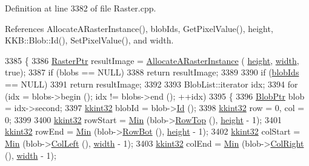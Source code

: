Definition at line 3382 of file Raster.\+cpp.



References Allocate\+A\+Raster\+Instance(), blob\+Ids, Get\+Pixel\+Value(), height, K\+K\+B\+::\+Blob\+::\+Id(), Set\+Pixel\+Value(), and width.


\begin{DoxyCode}
3385 \{
3386   \hyperlink{class_k_k_b_1_1_raster}{RasterPtr}  resultImage = \hyperlink{class_k_k_b_1_1_raster_aa879980d112c01cb7ad9a3cfc7cd6f64}{AllocateARasterInstance} (
      \hyperlink{class_k_k_b_1_1_raster_af39ff189de4fbb6de98392e187efafb7}{height}, \hyperlink{class_k_k_b_1_1_raster_ae0bcc103e191c3421d7692dc69ceb554}{width}, \textcolor{keyword}{true});
3387   \textcolor{keywordflow}{if}  (blobs == NULL)
3388     \textcolor{keywordflow}{return} resultImage;
3389 
3390   \textcolor{keywordflow}{if}  (\hyperlink{class_k_k_b_1_1_raster_a0fc9a1588e809db0b701f0a886bfd18c}{blobIds} == NULL)
3391     \textcolor{keywordflow}{return} resultImage;
3392 
3393   BlobList::iterator  idx;
3394   \textcolor{keywordflow}{for}  (idx = blobs->begin ();  idx != blobs->end ();  ++idx)
3395   \{
3396     \hyperlink{class_k_k_b_1_1_blob}{BlobPtr}  blob = idx->second;
3397     \hyperlink{namespace_k_k_b_a8fa4952cc84fda1de4bec1fbdd8d5b1b}{kkint32}  blobId = blob->\hyperlink{class_k_k_b_1_1_blob_add1ed75f6509956508b71aabeeae213c}{Id} ();
3398     \hyperlink{namespace_k_k_b_a8fa4952cc84fda1de4bec1fbdd8d5b1b}{kkint32}  row = 0, col = 0;
3399 
3400     \hyperlink{namespace_k_k_b_a8fa4952cc84fda1de4bec1fbdd8d5b1b}{kkint32}  rowStart = \hyperlink{namespace_k_k_b_ad030d1ca8bd5038824c4a923a4d23fb5}{Min} (blob->\hyperlink{class_k_k_b_1_1_blob_ab6735f537773b0a21f2e37c8793f8868}{RowTop}   (), \hyperlink{class_k_k_b_1_1_raster_af39ff189de4fbb6de98392e187efafb7}{height} - 1);
3401     \hyperlink{namespace_k_k_b_a8fa4952cc84fda1de4bec1fbdd8d5b1b}{kkint32}  rowEnd   = \hyperlink{namespace_k_k_b_ad030d1ca8bd5038824c4a923a4d23fb5}{Min} (blob->\hyperlink{class_k_k_b_1_1_blob_a6ffc22c0be20c597d49b0f5aa7aad008}{RowBot}   (), \hyperlink{class_k_k_b_1_1_raster_af39ff189de4fbb6de98392e187efafb7}{height} - 1);
3402     \hyperlink{namespace_k_k_b_a8fa4952cc84fda1de4bec1fbdd8d5b1b}{kkint32}  colStart = \hyperlink{namespace_k_k_b_ad030d1ca8bd5038824c4a923a4d23fb5}{Min} (blob->\hyperlink{class_k_k_b_1_1_blob_a42dc8a4c5009bcc67cbc39848169559a}{ColLeft}  (), \hyperlink{class_k_k_b_1_1_raster_ae0bcc103e191c3421d7692dc69ceb554}{width}  - 1);
3403     \hyperlink{namespace_k_k_b_a8fa4952cc84fda1de4bec1fbdd8d5b1b}{kkint32}  colEnd   = \hyperlink{namespace_k_k_b_ad030d1ca8bd5038824c4a923a4d23fb5}{Min} (blob->\hyperlink{class_k_k_b_1_1_blob_a9ae87430e9269e0fbfcd88a2d5891b88}{ColRight} (), \hyperlink{class_k_k_b_1_1_raster_ae0bcc103e191c3421d7692dc69ceb554}{width}  - 1);

\end{DoxyCode}
